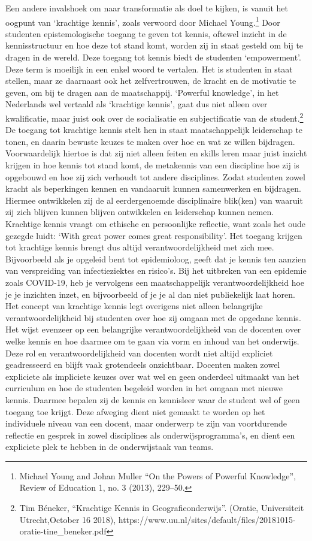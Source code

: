 \documentclass{jote-book}
\begin{document}
	Een andere invalshoek om naar transformatie als doel te kijken, is vanuit het oogpunt van ‘krachtige kennis', zoals verwoord door Michael Young.\footnote{Michael Young and Johan Muller “On the Powers of Powerful Knowledge”, Review of Education 1, no. 3 (2013), 229--50.} Door studenten epistemologische toegang te geven tot kennis, oftewel inzicht in de kennisstructuur en hoe deze tot stand komt, worden zij in staat gesteld om bij te dragen in de wereld. Deze toegang tot kennis biedt de studenten ‘empowerment'. Deze term is moeilijk in een enkel woord te vertalen. Het is studenten in staat stellen, maar ze daarnaast ook het zelfvertrouwen, de kracht en de motivatie te geven, om bij te dragen aan de maatschappij. ‘Powerful knowledge', in het Nederlands wel vertaald als ‘krachtige kennis', gaat dus niet alleen over kwalificatie, maar juist ook over de socialisatie en subjectificatie van de student.\footnote{Tim Béneker, “Krachtige Kennis in Geografieonderwijs”. (Oratie, Universiteit Utrecht,October 16 2018), https://www.uu.nl/sites/default/files/20181015-oratie-tine\_beneker.pdf} De toegang tot krachtige kennis stelt hen in staat maatschappelijk leiderschap te tonen, en daarin bewuste keuzes te maken over hoe en wat ze willen bijdragen. Voorwaardelijk hiertoe is dat zij niet alleen feiten en skills leren maar juist inzicht krijgen in hoe kennis tot stand komt, de metakennis van een discipline hoe zij is opgebouwd en hoe zij zich verhoudt tot andere disciplines. Zodat studenten zowel kracht als beperkingen kennen en vandaaruit kunnen samenwerken en bijdragen. Hiermee ontwikkelen zij de al eerdergenoemde disciplinaire blik(ken) van waaruit zij zich blijven kunnen blijven ontwikkelen en leiderschap kunnen nemen. Krachtige kennis vraagt om ethische en persoonlijke reflectie, want zoals het oude gezegde luidt: ‘With great power comes great responsibility'. Het toegang krijgen tot krachtige kennis brengt dus altijd verantwoordelijkheid met zich mee. Bijvoorbeeld als je opgeleid bent tot epidemioloog, geeft dat je kennis ten aanzien van verspreiding van infectieziektes en risico's. Bij het uitbreken van een epidemie zoals COVID-19, heb je vervolgens een maatschappelijk verantwoordelijkheid hoe je je inzichten inzet, en bijvoorbeeld of je je al dan niet publiekelijk laat horen. Het concept van krachtige kennis legt overigens niet alleen belangrijke verantwoordelijkheid bij studenten over hoe zij omgaan met de opgedane kennis. Het wijst evenzeer op een belangrijke verantwoordelijkheid van de docenten over welke kennis en hoe daarmee om te gaan via vorm en inhoud van het onderwijs. Deze rol en verantwoordelijkheid van docenten wordt niet altijd expliciet geadresseerd en blijft vaak grotendeels onzichtbaar. Docenten maken zowel expliciete als impliciete keuzes over wat wel en geen onderdeel uitmaakt van het curriculum en hoe de studenten begeleid worden in het omgaan met nieuwe kennis. Daarmee bepalen zij de kennis en kennisleer waar de student wel of geen toegang toe krijgt. Deze afweging dient niet gemaakt te worden op het individuele niveau van een docent, maar onderwerp te zijn van voortdurende reflectie en gesprek in zowel disciplines als onderwijsprogramma's, en dient een expliciete plek te hebben in de onderwijstaak van teams.
\end{document}
